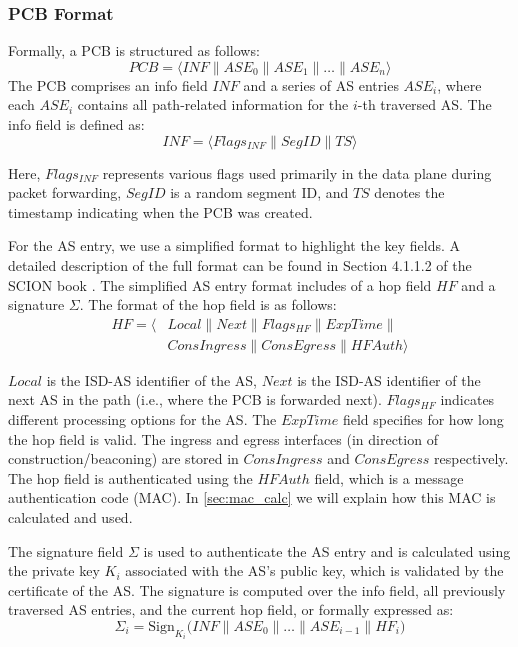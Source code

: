 \subsubsection{PCB Format}
Formally, a PCB is structured as follows:
$$ PCB = \langle INF \parallel ASE_0 \parallel ASE_1 \parallel \ldots \parallel ASE_n \rangle $$
\newpage
The PCB comprises an info field $INF$ and a series of AS entries $ASE_i$, where each $ASE_i$ contains all path-related information for the $i$-th traversed AS.
The info field is defined as:
$$ INF = \langle Flags_{INF} \parallel SegID \parallel TS \rangle $$

Here, $Flags_{INF}$ represents various flags used primarily in the data plane during packet forwarding, $SegID$ is a random segment ID, and $TS$ denotes the timestamp indicating when the PCB was created.

For the AS entry, we use a simplified format to highlight the key fields.
A detailed description of the full format can be found in Section 4.1.1.2 of the SCION book \cite{Perrig2022}.
The simplified AS entry format includes of a hop field $HF$ and a signature $\Sigma$.
The format of the hop field is as follows:
\begin{align*}
    HF = \langle &Local \parallel Next \parallel Flags_{HF} \parallel ExpTime \parallel \\  
    &ConsIngress \parallel ConsEgress \parallel HFAuth\rangle 
\end{align*}

$Local$ is the ISD-AS identifier of the AS, $Next$ is the ISD-AS identifier of the next AS in the path (i.e., where the PCB is forwarded next).
$Flags_{HF}$ indicates different processing options for the AS.
The $ExpTime$ field specifies for how long the hop field is valid.
The ingress and egress interfaces (in direction of construction/beaconing) are stored in $ConsIngress$ and $ConsEgress$ respectively.
The hop field is authenticated using the $HFAuth$ field, which is a message authentication code (MAC).
In \cref{sec:mac_calc} we will explain how this MAC is calculated and used.

The signature field $\Sigma$ is used to authenticate the AS entry and is calculated using the private key $K_i$ associated with the AS's public key, which is validated by the certificate of the AS.
The signature is computed over the info field, all previously traversed AS entries, and the current hop field, or formally expressed as:
$$\Sigma_i = \text{Sign}_{K_i} \bigl( INF \parallel ASE_0 \parallel \dots \parallel ASE_{i-1} \parallel HF_i \bigr)$$

